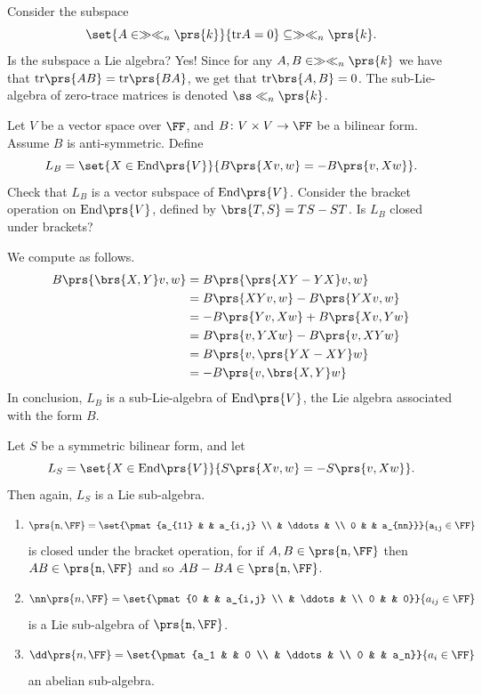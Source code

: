 \documentclass[10pt,a4paper,twoside,openany,hidelinks]{book}
\begin{document}
\begin{exercise}
Consider the subspace \[\set{A \in \gg \ll_n\prs{k}}{\mathrm{tr} A = 0} \subseteq \gg \ll_n\prs{k}\text{.}\] Is the subspace a Lie algebra? Yes! Since for any $A,B \in \gg \ll_n\prs{k}$ we have that $\mathrm{tr}\prs{AB} = \mathrm{tr}\prs{BA}$, we get that $\mathrm{tr}\brs{A,B} = 0$.
The sub-Lie-algebra of zero-trace matrices is denoted $\ss\ll_n\prs{k}$.
\end{exercise}
\begin{exercise}
Let $V$ be a vector space over $\FF$, and $B \colon V \times V \to \FF$ be a bilinear form.
Assume $B$ is anti-symmetric. Define \[L_B = \set{X \in \mathrm{End}\prs{V}}{B\prs{Xv,w} = -B\prs{v,Xw}}\text{.}\]
Check that $L_B$ is a vector subspace of $\mathrm{End}\prs{V}$.
Consider the bracket operation on $\mathrm{End}\prs{V}$, defined by $\brs{T,S} = TS - ST$.
Is $L_B$ closed under brackets?
\end{exercise}
\begin{solution}
We compute as follows.
\begin{align*}
B\prs{\brs{X,Y}v, w} &= B\prs{\prs{XY - YX}v, w} \\
&= B\prs{XY v, w} - B\prs{YXv,w} \\
&= -B\prs{Yv,Xw} + B\prs{Xv,Yw} \\
&= B\prs{v,YXw} -B\prs{v,XYw} \\
&= B\prs{v, \prs{YX - XY}w} \\
&= -B\prs{v, \brs{X,Y}w}
\end{align*}
In conclusion, $L_B$ is a sub-Lie-algebra of $\mathrm{End}\prs{V}$, the Lie algebra associated with the form $B$.
\end{solution}
\begin{exercise}
Let $S$ be a symmetric bilinear form, and let \[L_S = \set{X \in \mathrm{End}\prs{V}}{S\prs{Xv, w} = -S\prs{v,Xw}}\text{.}\]
Then again, $L_S$ is a Lie sub-algebra.
\end{exercise}
\begin{examples}
\begin{enumerate}
\item
\[\tt\prs{n,\FF} = \set{\pmat{a_{11} & & a_{i,j} \\ & \ddots & \\ 0 & & a_{nn}}}{a_{ij} \in \FF}\]
is closed under the bracket operation, for if $A,B \in \tt\prs{n,\FF}$ then $AB \in \tt\prs{n,\FF}$ and so $AB - BA \in \tt\prs{n,\FF}$.
\item \[\nn\prs{n,\FF} = \set{\pmat{0 & & a_{i,j} \\ & \ddots & \\ 0 & & 0}}{a_{ij} \in \FF}\]
is a Lie sub-algebra of $\tt\prs{n,\FF}$.
\item \[\dd\prs{n,\FF} = \set{\pmat{a_1 & & 0 \\ & \ddots & \\ 0 & & a_n}}{a_i \in \FF}\]
an abelian sub-algebra. 
\end{enumerate}
\end{examples}
\end{document}
